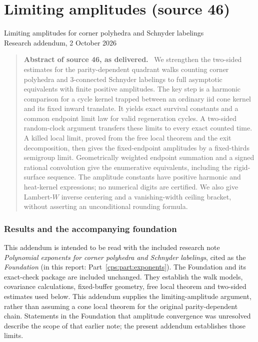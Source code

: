 \documentclass[11pt,letterpaper]{article}
\numberwithin{equation}{section}
\theoremstyle{remark}\newtheorem{remark}[theorem]{Remark}
\newenvironment{sourceabstract}[1]{\begin{quote}\small\textbf{Abstract of #1, as delivered.}\ }{\end{quote}}
\begin{document}
\part{Limiting amplitudes (source 46)}\label{cps:part:amplitudes}
\begin{center}\large Limiting amplitudes for corner polyhedra and Schnyder labelings\\[2pt]
\normalsize Research addendum, 2 October 2026\end{center}
\begin{sourceabstract}{source 46}
We strengthen the two-sided estimates for the parity-dependent quadrant walks counting corner polyhedra and 3-connected Schnyder labelings to full asymptotic equivalents with finite positive amplitudes. The key step is a harmonic comparison for a cycle kernel trapped between an ordinary iid cone kernel and its fixed inward translate. It yields exact survival constants and a common endpoint limit law for valid regeneration cycles. A two-sided random-clock argument transfers these limits to every exact counted time. A killed local limit, proved from the free local theorem and the exit decomposition, then gives the fixed-endpoint amplitudes by a fixed-thirds semigroup limit. Geometrically weighted endpoint summation and a signed rational convolution give the enumerative equivalents, including the rigid-surface sequence. The amplitude constants have positive harmonic and heat-kernel expressions; no numerical digits are certified. We also give Lambert-$W$ inverse centering and a vanishing-width ceiling bracket, without asserting an unconditional rounding formula.
\end{sourceabstract}

\section{Results and the accompanying foundation}
This addendum is intended to be read with the included research note \emph{Polynomial exponents for corner polyhedra and Schnyder labelings}, cited as the \emph{Foundation} (in this report: Part~\ref{cps:part:exponents}). The Foundation and its exact-check package are included unchanged. They establish the walk models, covariance calculations, fixed-buffer geometry, free local theorem and two-sided estimates used below. This addendum supplies the limiting-amplitude argument, rather than assuming a cone local theorem for the original parity-dependent chain. Statements in the Foundation that amplitude convergence was unresolved describe the scope of that earlier note; the present addendum establishes those limits.
\end{document}
